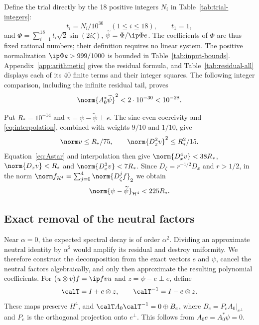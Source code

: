 Define the trial directly by the 18 positive integers $N_i$ in Table~\ref{tab:trial-integers}:
\begin{equation}\label{eq:galerkin-trial}
 t_i=N_i/10^{30}\quad(1\le i\le18),\qquad t_1=1,
\end{equation}
and $\Phi=\sum_{i=1}^{18}t_i\sqrt2\sin(2i\zeta)$, $\widetilde\psi=\Phi/\ip\Phi e$.
The coefficients of $\Phi$ are thus fixed rational numbers; their definition requires no linear system. The positive normalization $\ip\Phi e>999/1000$ is bounded in Table~\ref{tab:input-bounds}. Appendix~\ref{app:arithmetic} gives the residual formula, and Table~\ref{tab:residual-all} displays each of its 40 finite terms and their integer squares. The following integer comparison, including the infinite residual tail, proves
\begin{equation}\label{eq:adjoint-data}
 \norm{A_0^*\widetilde\psi}^2<2\cdot10^{-30}<10^{-28}.
\end{equation}


Put $R_*=10^{-14}$ and $v=\psi-\widetilde\psi\perp e$. The sine-even coercivity and \eqref{eq:interpolation}, combined with weights $9/10$ and $1/10$, give
\[
 \norm v\le R_*/75,\qquad \norm{D_x^2v}^2\le R_*^2/15.
\]
Equation~\eqref{eq:Astar} and interpolation then give $\norm{D_x^4v}<38R_*$, $\norm{D_xv}<R_*$ and $\norm{D_x^3v}<7R_*$. Since $D_\zeta=r^{-1/2}D_x$ and $r>1/2$, in the norm $\norm f_{\mathcal H^4}=\sum_{j=0}^4\norm{D_\zeta^jf}_2$ we obtain
\begin{equation}\label{eq:adjoint-H4}
 \norm{\psi-\widetilde\psi}_{\mathcal H^4}<225R_*.
\end{equation}

\subsection{Exact removal of the neutral factors}
Near $\alpha=0$, the expected spectral decay is of order $\alpha^2$. Dividing an approximate neutral identity by $\alpha^2$ would amplify its residual and destroy uniformity. We therefore construct the decomposition from the exact vectors $e$ and $\psi$, cancel the neutral factors algebraically, and only then approximate the resulting polynomial coefficients.
For $(u\otimes v)f=\ip f v u$ and $z=\psi-e\perp e$, define
\begin{equation}\label{eq:T}
 \calT=I+e\otimes z,\qquad \calT^{-1}=I-e\otimes z.
\end{equation}
These maps preserve $H^4$, and $\calT A_0\calT^{-1}=0\oplus B_e$, where $B_e=P_eA_0|_{e^\perp}$ and $P_e$ is the orthogonal projection onto $e^\perp$. This follows from $A_0e=A_0^*\psi=0$.

